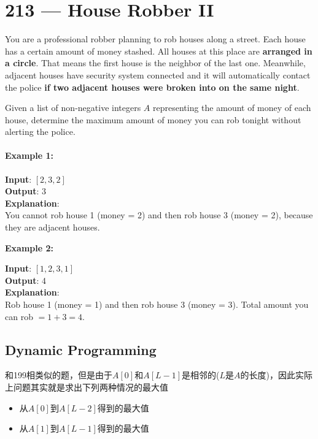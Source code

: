\section{213 --- House Robber II}
You are a professional robber planning to rob houses along a street. Each house has a certain amount of money stashed. All houses at this place are \textbf{arranged in a circle}. That means the first house is the neighbor of the last one. Meanwhile, adjacent houses have security system connected and it will automatically contact the police \textbf{if two adjacent houses were broken into on the same night}.
\par
Given a list of non-negative integers $A$ representing the amount of money of each house, determine the maximum amount of money you can rob tonight without alerting the police.
\paragraph{Example 1:}
\begin{flushleft}
\textbf{Input}: $[2,3,2]$
\\
\textbf{Output}: 3
\\
\textbf{Explanation}: 
\\
You cannot rob house 1 (money = 2) and then rob house 3 (money = 2), because they are adjacent houses.
\end{flushleft}
\textbf{Example 2:}
\begin{flushleft}
\textbf{Input}: $[1,2,3,1]$
\\
\textbf{Output}: 4
\\
\textbf{Explanation}: 
\\
Rob house 1 (money = 1) and then rob house 3 (money = 3). Total amount you can rob $= 1 + 3 = 4$.
\end{flushleft}
\subsection{Dynamic Programming}
和199相类似的题，但是由于$A[0]$和$A[L-1]$是相邻的($L$是$A$的长度)，因此实际上问题其实就是求出下列两种情况的最大值
\begin{itemize}
\item 从$A[0]$到$A[L-2]$得到的最大值
\item 从$A[1]$到$A[L-1]$得到的最大值
\end{itemize}

